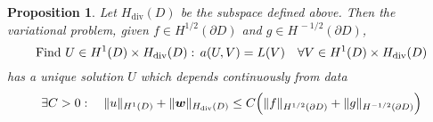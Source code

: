 \documentclass[10pt, a4paper, twoside, openright]{book}
\theoremstyle{definition}
\theoremstyle{plain}
\theoremstyle{plain}
\theoremstyle{plain}
\newtheorem{proposition}[subsection]{Proposition}
\theoremstyle{plain}
\theoremstyle{plain}
\theoremstyle{plain}
\theoremstyle{plain}
\theoremstyle{plain}
\DeclareMathOperator{\divergence}{div}
\begin{document}
\begin{proposition}
 Let $H_{\divergence}(D)$ be the subspace defined above. Then the variational problem, given $f\in H^{1/2}(\partial D)$ and $g\in H^{\,-1/2}(\partial D)$,
 \begin{equation}
  \textup{Find }U\in H^1(D)\times H_{\divergence}(D):\,a(U,V)=L(V) \quad\forall V\in H^1(D)\times H_{\divergence}(D)
 \end{equation}
has a unique solution $U$ 
which depends continuously from data
\begin{equation}
 \exists C>0:\quad \|u\|_{H^1(D)} + \|\bm w\|_{H_{\divergence}(D)}\leq C\Bigl(\|f\|_{H^{1/2}(\partial D)}+\|g\|_{H^{-1/2}(\partial D)}\Bigr)
\end{equation}

\end{proposition}
\end{document}
